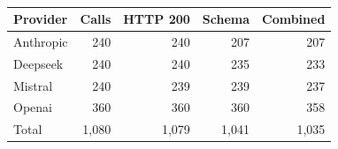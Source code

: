 \begin{table}[!t]
\centering\ifshowrevisions\color{blue}\else\color{black}\fi\footnotesize
\caption{}
\label{tab:matched-nodes}
\begin{tabular}{lrrrr}
\toprule Provider & Calls & HTTP 200 & Schema & Combined \\
\midrule
Anthropic & 240 & 240 & 207 & 207 \\
Deepseek & 240 & 240 & 235 & 233 \\
Mistral & 240 & 239 & 239 & 237 \\
Openai & 360 & 360 & 360 & 358 \\
\midrule Total & 1,080 & 1,079 & 1,041 & 1,035 \\
\bottomrule
\end{tabular}
\end{table}
